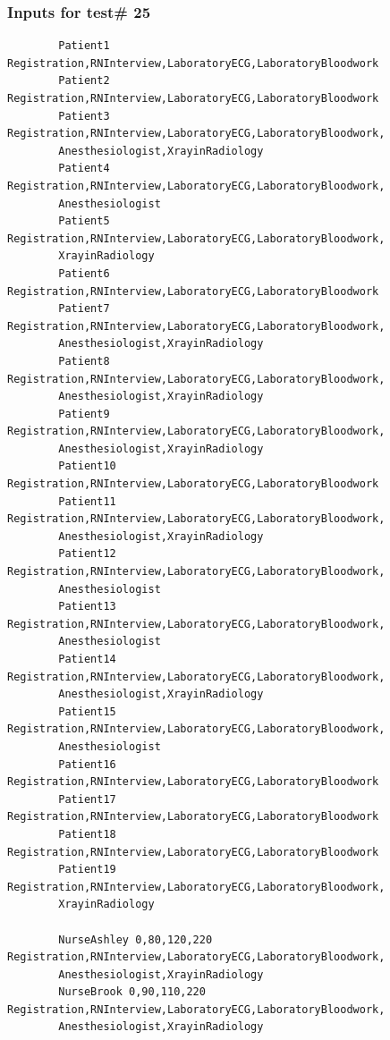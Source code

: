 \documentclass[12pt]{article}
\begin{document}
		\subsubsection{Inputs for test\# 25}
		\begin{verbatim}
		Patient1 Registration,RNInterview,LaboratoryECG,LaboratoryBloodwork
		Patient2 Registration,RNInterview,LaboratoryECG,LaboratoryBloodwork
		Patient3 Registration,RNInterview,LaboratoryECG,LaboratoryBloodwork,
		Anesthesiologist,XrayinRadiology
		Patient4 Registration,RNInterview,LaboratoryECG,LaboratoryBloodwork,
		Anesthesiologist
		Patient5 Registration,RNInterview,LaboratoryECG,LaboratoryBloodwork,
		XrayinRadiology
		Patient6 Registration,RNInterview,LaboratoryECG,LaboratoryBloodwork
		Patient7 Registration,RNInterview,LaboratoryECG,LaboratoryBloodwork,
		Anesthesiologist,XrayinRadiology
		Patient8 Registration,RNInterview,LaboratoryECG,LaboratoryBloodwork,
		Anesthesiologist,XrayinRadiology
		Patient9 Registration,RNInterview,LaboratoryECG,LaboratoryBloodwork,
		Anesthesiologist,XrayinRadiology
		Patient10 Registration,RNInterview,LaboratoryECG,LaboratoryBloodwork
		Patient11 Registration,RNInterview,LaboratoryECG,LaboratoryBloodwork,
		Anesthesiologist,XrayinRadiology
		Patient12 Registration,RNInterview,LaboratoryECG,LaboratoryBloodwork,
		Anesthesiologist
		Patient13 Registration,RNInterview,LaboratoryECG,LaboratoryBloodwork,
		Anesthesiologist
		Patient14 Registration,RNInterview,LaboratoryECG,LaboratoryBloodwork,
		Anesthesiologist,XrayinRadiology
		Patient15 Registration,RNInterview,LaboratoryECG,LaboratoryBloodwork,
		Anesthesiologist
		Patient16 Registration,RNInterview,LaboratoryECG,LaboratoryBloodwork
		Patient17 Registration,RNInterview,LaboratoryECG,LaboratoryBloodwork
		Patient18 Registration,RNInterview,LaboratoryECG,LaboratoryBloodwork
		Patient19 Registration,RNInterview,LaboratoryECG,LaboratoryBloodwork,
		XrayinRadiology
		
		NurseAshley 0,80,120,220 Registration,RNInterview,LaboratoryECG,LaboratoryBloodwork,
		Anesthesiologist,XrayinRadiology
		NurseBrook 0,90,110,220 Registration,RNInterview,LaboratoryECG,LaboratoryBloodwork,
		Anesthesiologist,XrayinRadiology
		\end{verbatim}
		
\end{document}
